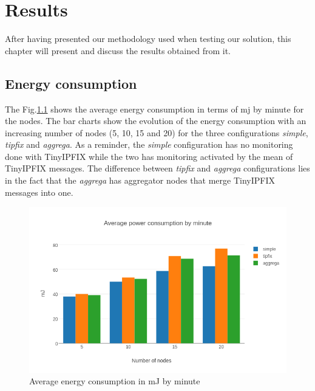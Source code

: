 \chapter{Results}

After having presented our methodology used when testing our solution, this chapter will present and discuss the results obtained from it.

\section{Energy consumption}

The Fig.\ref{fig:average_energy} shows the average energy consumption in terms of \acrfull{mj} by minute for the nodes. The bar charts show the evolution of the energy consumption with an increasing number of nodes (5, 10, 15 and 20) for the three configurations \textit{simple}, \textit{tipfix} and \textit{aggrega}. As a reminder, the \textit{simple} configuration has no monitoring done with TinyIPFIX while the two has monitoring activated by the mean of TinyIPFIX messages. The difference between \textit{tipfix} and \textit{aggrega} configurations lies in the fact that the \textit{aggrega} has aggregator nodes that merge TinyIPFIX messages into one. \\

\begin{figure}[h]
  \centering
  \includegraphics[width=\textwidth]{res/average_energy.png}
  \caption{Average energy consumption in mJ by minute}
  \label{fig:average_energy}
\end{figure}

